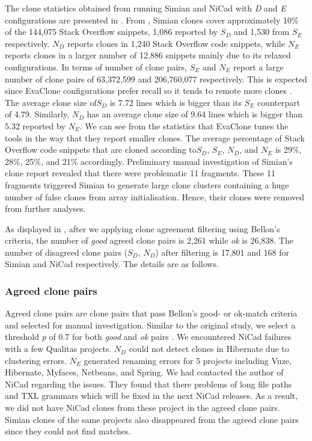 \documentclass{sig-alternate-05-2015}
\newcommand\FIXME[1]{\textbf{FIXME: #1}}
\begin{document}
The clone statistics obtained from running Simian and NiCad with \textit{D} and \textit{E} configurations are presented in . From , Simian clones cover approximately 10\% of the 144,075 Stack Overflow snippets, 1,086 reported by $S_D$ and 1,530 from $S_E$ respectively. $N_D$ reports clones in 1,240 Stack Overflow code snippets, while $N_E$ reports clones in a larger number of 12,886 snippets  mainly due to its relaxed configurations. In terms of number of clone pairs, $S_E$ and $N_E$ report a large number of clone pairs of 63,372,599 and 206,760,077 respectively. This is expected since EvaClone configurations prefer recall so it tends to remote more clones \cite{Wang2013}. The average clone size of$S_D$ is 7.72 lines which is bigger than its $S_E$ counterpart of 4.79. Similarly, $N_D$ has an average clone size of 9.64 lines which is bigger than 5.32 reported by $N_E$. We can see from the statistics that EvaClone tunes the tools in the way that they report smaller clones. The average percentage of Stack Overflow code snippets that are cloned according to$S_D$, $S_E$, $N_D$, and $N_E$ is 29\%, 28\%, 25\%, and 21\% accordingly. Preliminary manual investigation of Simian's clone report revealed that there were problematic 11 fragments. These 11 fragments triggered Simian to generate large clone clusters containing a huge number of false clones from array initialisation. Hence, their clones were removed from further analyses. 

As displayed in , after we applying clone agreement filtering using Bellon's criteria, the number of \textit{good} agreed clone pairs is 2,261 while \textit{ok} is 26,838. The number of disagreed clone pairs ($S_D$, $N_D$) after filtering is 17,801 and 168 for Simian and NiCad respectively. The details are as follows.

\subsubsection{Agreed clone pairs}

Agreed clone pairs are clone pairs that pass Bellon's good- or ok-match criteria and selected for manual investigation. Similar to the original study, we select a threshold \textit{p} of 0.7 for both \textit{good} and \textit{ok} pairs \cite{Bellon2007}. %
We encountered NiCad failures with a few Qualitas projects. 
$N_D$ could not detect clones in Hibernate due to clustering errors. $N_E$ generated renaming errors for 5 projects including Vuze, Hibernate, Myfaces, Netbeans, and Spring. We had contacted the author of NiCad regarding the issues. They found that there problems of long file paths and TXL grammars which will be fixed in the next NiCad releases. As a result, we did not have NiCad clones from these project in the agreed clone pairs. Simian clones of the same projects also disappeared from the agreed clone pairs since they could not find matches.
\end{document}
